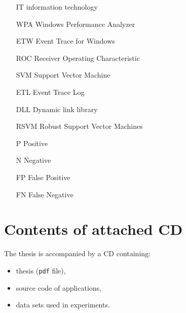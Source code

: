 \documentclass[a4paper,twoside,12pt]{book}
\begin{document}
\begin{appendices}
\begin{itemize}
	\item[IT] information technology
	\item[WPA] Windows Performance Analyzer 
	\item[ETW] Event Trace for Windows 
	\item[ROC] Receiver Operating Characteristic
	\item[SVM] Support Vector Machine 
	\item[ETL] Event Trace Log 
	\item[DLL] Dynamic link library
	\item[RSVM] Robust Support Vector Machines 
	\item[P] Positive 
	\item[N] Negative 
	\item[FP] False Positive
	\item[FN] False Negative  
\end{itemize}


 

\chapter*{Contents of attached CD}

The thesis is accompanied by a CD containing:
\begin{itemize}
\item thesis (\texttt{pdf} file),
\item source code of applications,
\item data sets used in experiments.
\end{itemize}

\listoffigures
{}
\listoftables
{}
	
\end{appendices}
\end{document}
